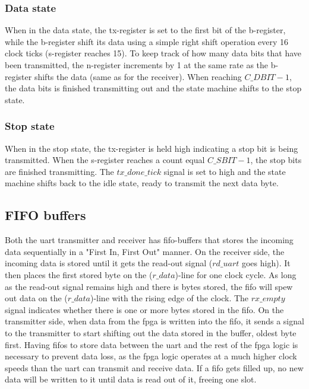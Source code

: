 \documentclass[main.tex]{subfiles}
\begin{document}
\subsubsection{Data state}
When in the data state, the tx-register is set to the first bit of the b-register, while the b-register shift its data using a simple right shift operation every 16 clock ticks (s-register reaches 15). To keep track of how many data bits that have been transmitted, the n-register increments by 1 at the same rate as the b-register shifts the data (same as for the receiver). When reaching $C\_DBIT-1$, the data bits is finished transmitting out and the state machine shifts to the stop state.

\subsubsection{Stop state}
When in the stop state, the tx-register is held high indicating a stop bit is being transmitted. When the s-register reaches a count equal $C\_SBIT - 1$, the stop bits are finished transmitting. The $tx\_done\_tick$ signal is set to high and the state machine shifts back to the idle state, ready to transmit the next data byte.

\subsection{FIFO buffers}
Both the \gls{uart} transmitter and receiver has \gls{fifo}-buffers that stores the incoming data sequentially in a "First In, First Out" manner. On the receiver side, the incoming data is stored until it gets the read-out signal ($rd\_uart$ goes high). It then places the first stored byte on the ($r\_data$)-line for one clock cycle. As long as the read-out signal remains high and there is bytes stored, the \gls{fifo} will spew out data on the ($r\_data$)-line with the rising edge of the clock. The $rx\_empty$ signal indicates whether there is one or more bytes stored in the \gls{fifo}. On the transmitter side, when data from the \gls{fpga} is written into the \gls{fifo}, it sends a signal to the transmitter to start shifting out the data stored in the buffer, oldest byte first. Having \glspl{fifo} to store data between the \gls{uart} and the rest of the \gls{fpga} logic is necessary to prevent data loss, as the \gls{fpga} logic operates at a much higher clock speeds than the \gls{uart}  can transmit and receive data. If a \gls{fifo} gets filled up, no new data will be written to it until data is read out of it, freeing one slot.
\end{document}
